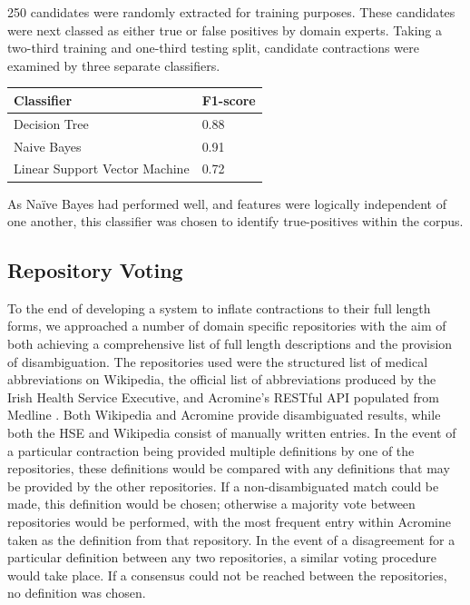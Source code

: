 250 candidates were randomly extracted for training purposes. These candidates were next classed as either true or false positives by domain experts. Taking a two-third training and one-third testing split, candidate contractions were examined by three separate classifiers.

\begin{table}[h]
\setlength{\tabcolsep}{0.5em}
\begin{center}
\renewcommand{\arraystretch}{1.5}
\begin{tabular}{|l|l|}
\hline
\textbf{Classifier}                    & \textbf{F1-score} \\ \hline
Decision Tree                 & 0.88     \\
Naive Bayes                   & 0.91     \\
Linear Support Vector Machine\index{Support Vector Machines} & 0.72     \\ \hline
\end{tabular}

\end{center}
\end{table}

As Naïve Bayes had performed well, and features were logically independent of one another, this classifier was chosen to identify true-positives within the corpus. 


\subsection{Repository Voting}

To the end of developing a system to inflate contractions to their full length forms, we approached a number of domain specific repositories with the aim of both achieving a comprehensive list of full length descriptions and the provision of disambiguation. The repositories used were the structured list of medical
abbreviations on Wikipedia, the official list of abbreviations produced by the Irish Health Service Executive, and Acromine's RESTful API populated from Medline \cite{okazaki2006building}. Both Wikipedia and Acromine provide disambiguated results, while both the HSE and Wikipedia consist of manually written entries.
In the event of a particular contraction being provided multiple definitions by one of the repositories, these definitions would be compared with any definitions that may be provided by the other repositories. If a
non-disambiguated match could be made, this definition would be chosen; otherwise a majority vote between
repositories would be performed, with the most frequent entry within Acromine taken as the definition from
that repository. In the event of a disagreement for a particular definition between any two repositories, a similar voting procedure would
take place. If a consensus could not be reached between the repositories, no definition was chosen. 

